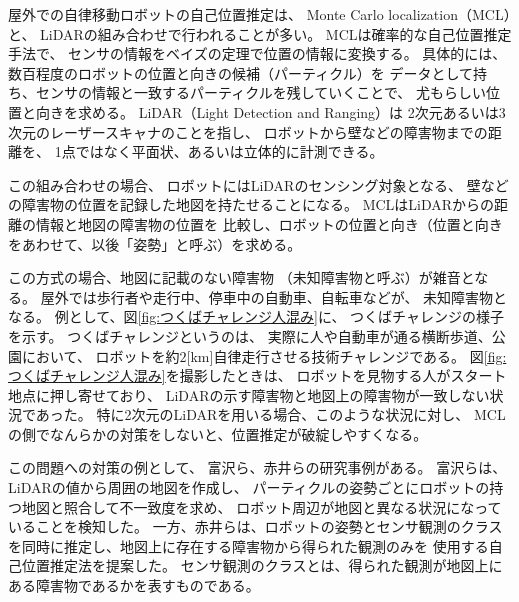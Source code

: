 \documentclass{jarticle}
\begin{document}
屋外での自律移動ロボットの自己位置推定は、
Monte Carlo localization（MCL）\cite{gutmann2002}と、
LiDARの組み合わせで行われることが多い。
MCLは確率的な自己位置推定手法で、
センサの情報をベイズの定理で位置の情報に変換する。
具体的には、数百程度のロボットの位置と向きの候補（パーティクル）を
データとして持ち、センサの情報と一致するパーティクルを残していくことで、
尤もらしい位置と向きを求める。
LiDAR（Light Detection and Ranging）は
2次元あるいは3次元のレーザースキャナのことを指し、
ロボットから壁などの障害物までの距離を、
1点ではなく平面状、あるいは立体的に計測できる。


この組み合わせの場合、
ロボットにはLiDARのセンシング対象となる、
壁などの障害物の位置を記録した地図を持たせることになる。
MCLはLiDARからの距離の情報と地図の障害物の位置を
比較し、ロボットの位置と向き（位置と向きをあわせて、以後「姿勢」と呼ぶ）を求める。


この方式の場合、地図に記載のない障害物
（未知障害物と呼ぶ）が雑音となる。
屋外では歩行者や走行中、停車中の自動車、自転車などが、
未知障害物となる。
例として、図\ref{fig:つくばチャレンジ人混み}に、
つくばチャレンジ\cite{つくばチャレンジ}の様子を示す。
つくばチャレンジというのは、
実際に人や自動車が通る横断歩道、公園において、
ロボットを約$2$[km]自律走行させる技術チャレンジである。
図\ref{fig:つくばチャレンジ人混み}を撮影したときは、
ロボットを見物する人がスタート地点に押し寄せており、
LiDARの示す障害物と地図上の障害物が一致しない状況であった。
特に2次元のLiDARを用いる場合、このような状況に対し、
MCLの側でなんらかの対策をしないと、位置推定が破綻しやすくなる。

この問題への対策の例として、
富沢ら\cite{富沢2012}、赤井ら\cite{赤井2019}の研究事例がある。
富沢ら\cite{富沢2012}は、LiDARの値から周囲の地図を作成し、
パーティクルの姿勢ごとにロボットの持つ地図と照合して不一致度を求め、
ロボット周辺が地図と異なる状況になっていることを検知した。
一方、赤井ら\cite{赤井2019}は、ロボットの姿勢とセンサ観測のクラス
を同時に推定し、地図上に存在する障害物から得られた観測のみを
使用する自己位置推定法を提案した。
センサ観測のクラスとは、得られた観測が地図上にある障害物であるかを表すものである。

\end{document}
